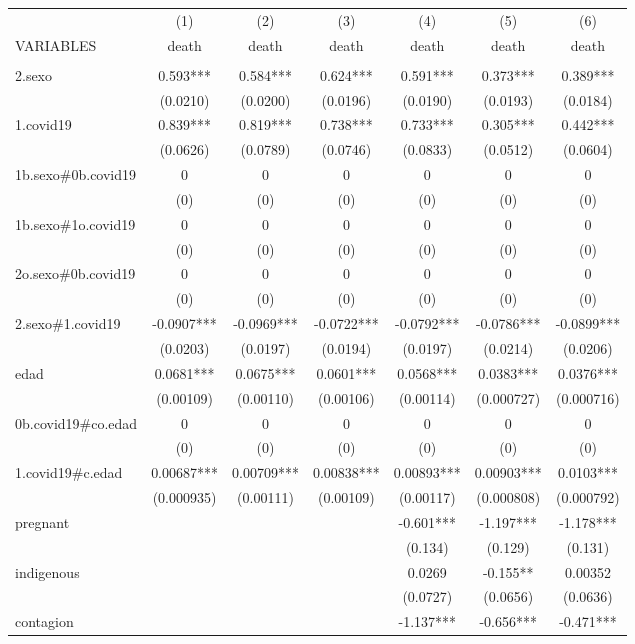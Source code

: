 \documentclass[]{article}
\begin{document}
\begin{tabular}{lcccccc} \hline
 & (1) & (2) & (3) & (4) & (5) & (6) \\
VARIABLES & death & death & death & death & death & death \\ \hline
 &  &  &  &  &  &  \\
2.sexo & 0.593*** & 0.584*** & 0.624*** & 0.591*** & 0.373*** & 0.389*** \\
 & (0.0210) & (0.0200) & (0.0196) & (0.0190) & (0.0193) & (0.0184) \\
1.covid19 & 0.839*** & 0.819*** & 0.738*** & 0.733*** & 0.305*** & 0.442*** \\
 & (0.0626) & (0.0789) & (0.0746) & (0.0833) & (0.0512) & (0.0604) \\
1b.sexo\#0b.covid19 & 0 & 0 & 0 & 0 & 0 & 0 \\
 & (0) & (0) & (0) & (0) & (0) & (0) \\
1b.sexo\#1o.covid19 & 0 & 0 & 0 & 0 & 0 & 0 \\
 & (0) & (0) & (0) & (0) & (0) & (0) \\
2o.sexo\#0b.covid19 & 0 & 0 & 0 & 0 & 0 & 0 \\
 & (0) & (0) & (0) & (0) & (0) & (0) \\
2.sexo\#1.covid19 & -0.0907*** & -0.0969*** & -0.0722*** & -0.0792*** & -0.0786*** & -0.0899*** \\
 & (0.0203) & (0.0197) & (0.0194) & (0.0197) & (0.0214) & (0.0206) \\
edad & 0.0681*** & 0.0675*** & 0.0601*** & 0.0568*** & 0.0383*** & 0.0376*** \\
 & (0.00109) & (0.00110) & (0.00106) & (0.00114) & (0.000727) & (0.000716) \\
0b.covid19\#co.edad & 0 & 0 & 0 & 0 & 0 & 0 \\
 & (0) & (0) & (0) & (0) & (0) & (0) \\
1.covid19\#c.edad & 0.00687*** & 0.00709*** & 0.00838*** & 0.00893*** & 0.00903*** & 0.0103*** \\
 & (0.000935) & (0.00111) & (0.00109) & (0.00117) & (0.000808) & (0.000792) \\
pregnant &  &  &  & -0.601*** & -1.197*** & -1.178*** \\
 &  &  &  & (0.134) & (0.129) & (0.131) \\
indigenous &  &  &  & 0.0269 & -0.155** & 0.00352 \\
 &  &  &  & (0.0727) & (0.0656) & (0.0636) \\
contagion &  &  &  & -1.137*** & -0.656*** & -0.471*** \\

\end{tabular}
\end{document}
